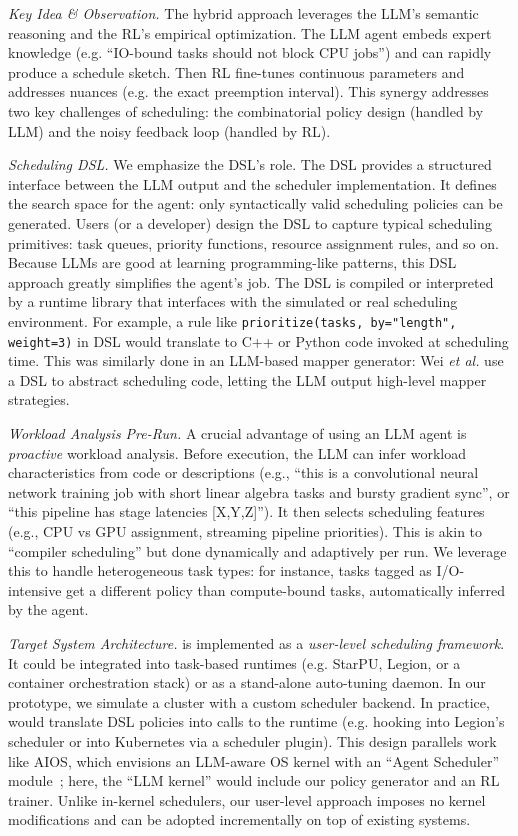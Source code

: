 \emph{Key Idea \& Observation.} The hybrid approach leverages the LLM's semantic reasoning and the RL's empirical optimization. The LLM agent embeds expert knowledge (e.g. ``IO-bound tasks should not block CPU jobs'') and can rapidly produce a schedule sketch. Then RL fine-tunes continuous parameters and addresses nuances (e.g. the exact preemption interval). This synergy addresses two key challenges of scheduling: the combinatorial policy design (handled by LLM) and the noisy feedback loop (handled by RL).

\emph{Scheduling DSL.} We emphasize the DSL's role. The DSL provides a structured interface between the LLM output and the scheduler implementation. It defines the search space for the agent: only syntactically valid scheduling policies can be generated. Users (or a developer) design the DSL to capture typical scheduling primitives: task queues, priority functions, resource assignment rules, and so on. Because LLMs are good at learning programming-like patterns, this DSL approach greatly simplifies the agent's job. The DSL is compiled or interpreted by a runtime library that interfaces with the simulated or real scheduling environment. For example, a rule like \texttt{prioritize(tasks, by="length", weight=3)} in DSL would translate to C++ or Python code invoked at scheduling time. This was similarly done in an LLM-based mapper generator: Wei \emph{et al.} use a DSL to abstract scheduling code, letting the LLM output high-level mapper strategies.

\emph{Workload Analysis Pre-Run.} A crucial advantage of using an LLM agent is \emph{proactive} workload analysis. Before execution, the LLM can infer workload characteristics from code or descriptions (e.g., ``this is a convolutional neural network training job with short linear algebra tasks and bursty gradient sync'', or ``this pipeline has stage latencies [X,Y,Z]''). It then selects scheduling features (e.g., CPU vs GPU assignment, streaming pipeline priorities). This is akin to ``compiler scheduling'' but done dynamically and adaptively per run. We leverage this to handle heterogeneous task types: for instance, tasks tagged as I/O-intensive get a different policy than compute-bound tasks, automatically inferred by the agent.

\emph{Target System Architecture.} \sys{} is implemented as a \emph{user-level scheduling framework}. It could be integrated into task-based runtimes (e.g. StarPU, Legion, or a container orchestration stack) or as a stand-alone auto-tuning daemon. In our prototype, we simulate a cluster with a custom scheduler backend. In practice, \sys{} would translate DSL policies into calls to the runtime (e.g. hooking into Legion's scheduler or into Kubernetes via a scheduler plugin). This design parallels work like AIOS, which envisions an LLM-aware OS kernel with an ``Agent Scheduler'' module~\cite{arxiv2403}; here, the ``LLM kernel'' would include our policy generator and an RL trainer. Unlike in-kernel schedulers, our user-level approach imposes no kernel modifications and can be adopted incrementally on top of existing systems.

